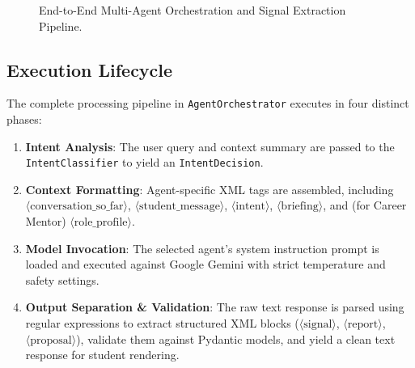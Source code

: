 \documentclass[12pt,a4paper]{article}
\begin{document}
\begin{figure}[htbp]
\caption{End-to-End Multi-Agent Orchestration and Signal Extraction Pipeline.}
\label{fig:orchestrator_arch}
\end{figure}

\subsection{Execution Lifecycle}
The complete processing pipeline in \texttt{AgentOrchestrator} executes in four distinct phases:
\begin{enumerate}[noitemsep,topsep=2pt]
    \item \textbf{Intent Analysis}: The user query and context summary are passed to the \texttt{IntentClassifier} to yield an \texttt{IntentDecision}.
    \item \textbf{Context Formatting}: Agent-specific XML tags are assembled, including $\langle\text{conversation\_so\_far}\rangle$, $\langle\text{student\_message}\rangle$, $\langle\text{intent}\rangle$, $\langle\text{briefing}\rangle$, and (for Career Mentor) $\langle\text{role\_profile}\rangle$.
    \item \textbf{Model Invocation}: The selected agent's system instruction prompt is loaded and executed against Google Gemini with strict temperature and safety settings.
    \item \textbf{Output Separation \& Validation}: The raw text response is parsed using regular expressions to extract structured XML blocks ($\langle\text{signal}\rangle$, $\langle\text{report}\rangle$, $\langle\text{proposal}\rangle$), validate them against Pydantic models, and yield a clean text response for student rendering.
\end{enumerate}
\end{document}
